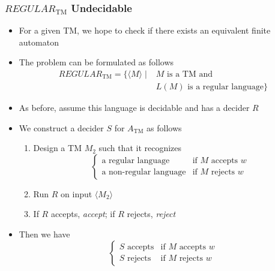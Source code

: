 




\begin{frame}[allowframebreaks] \frametitle{$REGULAR_{\text{TM}}$ Undecidable}
\begin{itemize}
\item For a given TM, we hope to check if there exists
  an equivalent finite automaton
\item The problem can be formulated as follows
  \begin{equation*}
    \begin{split}
      REGULAR_{\text{TM}} 
      = \{
      \langle  M\rangle \mid { } & M \mbox{ is a TM and} \\
      & L(M)
      \text{ is a regular language}    \}
    \end{split}
  \end{equation*}
\item As before, assume this language is decidable
  and has a decider $R$
\item We construct a decider $S$ for $A_{\text{TM}}$
  as follows
  \begin{enumerate}
  \item Design a TM $M_2$ such that it recognizes
    \begin{equation}
      \begin{cases}
        \text{a regular language}  & \text{if $M$ accepts $w$}  \\
        \text{a non-regular language} & \text{if $M$ rejects $w$}
      \end{cases}
    \label{eq:M2}
    \end{equation}
\item Run $R$ on input $\langle M_2 \rangle$
  \item If $R$ accepts, {\em accept}; if $R$ rejects,
    {\em reject}
  \end{enumerate}
\item Then we have
  \begin{equation*}
    \begin{cases}
     \text{$S$ accepts} & \text{if $M$ accepts $w$} \\
     \text{$S$ rejects} & \text{if $M$ rejects $w$}
    \end{cases}
  \end{equation*}

\end{itemize}
\end{frame}
